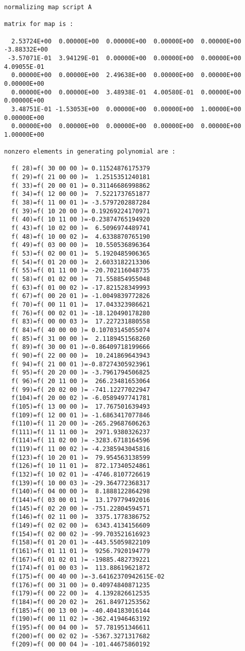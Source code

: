 \begin{footnotesize}
\begin{verbatim}
normalizing map script A

matrix for map is :

  2.53724E+00  0.00000E+00  0.00000E+00  0.00000E+00  0.00000E+00 -3.88332E+00
 -3.57071E-01  3.94129E-01  0.00000E+00  0.00000E+00  0.00000E+00  4.09055E-01
  0.00000E+00  0.00000E+00  2.49638E+00  0.00000E+00  0.00000E+00  0.00000E+00
  0.00000E+00  0.00000E+00  3.48938E-01  4.00580E-01  0.00000E+00  0.00000E+00
  3.48751E-01 -1.53053E+00  0.00000E+00  0.00000E+00  1.00000E+00  0.00000E+00
  0.00000E+00  0.00000E+00  0.00000E+00  0.00000E+00  0.00000E+00  1.00000E+00

nonzero elements in generating polynomial are :

  f( 28)=f( 30 00 00 )= 0.11524876175379
  f( 29)=f( 21 00 00 )=  1.2515351240181
  f( 33)=f( 20 00 01 )= 0.31146686998862
  f( 34)=f( 12 00 00 )=  7.5221737651877
  f( 38)=f( 11 00 01 )= -3.5797202887284
  f( 39)=f( 10 20 00 )= 0.19269224170971
  f( 40)=f( 10 11 00 )=-0.23874765194920
  f( 43)=f( 10 02 00 )=  6.5096974489741
  f( 48)=f( 10 00 02 )=  4.6338870765190
  f( 49)=f( 03 00 00 )=  10.550536896364
  f( 53)=f( 02 00 01 )=  5.1920485906365
  f( 54)=f( 01 20 00 )=  2.6033182213306
  f( 55)=f( 01 11 00 )= -20.702116048735
  f( 58)=f( 01 02 00 )=  71.558854955048
  f( 63)=f( 01 00 02 )= -17.821528349993
  f( 67)=f( 00 20 01 )= -1.0049839772826
  f( 70)=f( 00 11 01 )=  17.043323986621
  f( 76)=f( 00 02 01 )= -18.120490178280
  f( 83)=f( 00 00 03 )=  17.227231880558
  f( 84)=f( 40 00 00 )= 0.10703145055074
  f( 85)=f( 31 00 00 )=  2.1189451568260
  f( 89)=f( 30 00 01 )=-0.86409718199666
  f( 90)=f( 22 00 00 )=  10.241869643943
  f( 94)=f( 21 00 01 )=-0.87274305923961
  f( 95)=f( 20 20 00 )= -3.7961794506825
  f( 96)=f( 20 11 00 )=  266.23481653064
  f( 99)=f( 20 02 00 )= -741.12277022947
  f(104)=f( 20 00 02 )= -6.0589497741781
  f(105)=f( 13 00 00 )=  17.767501639493
  f(109)=f( 12 00 01 )= -1.6863417077846
  f(110)=f( 11 20 00 )= -265.29687606263
  f(111)=f( 11 11 00 )=  2971.9380326237
  f(114)=f( 11 02 00 )= -3283.6718164596
  f(119)=f( 11 00 02 )= -4.2385943045816
  f(123)=f( 10 20 01 )=  79.954563138599
  f(126)=f( 10 11 01 )=  872.17340524861
  f(132)=f( 10 02 01 )= -4746.8107726619
  f(139)=f( 10 00 03 )= -29.364772368317
  f(140)=f( 04 00 00 )=  8.1888122864298
  f(144)=f( 03 00 01 )=  13.179779492016
  f(145)=f( 02 20 00 )= -751.22804594571
  f(146)=f( 02 11 00 )=  3375.1778386752
  f(149)=f( 02 02 00 )=  6343.4134156609
  f(154)=f( 02 00 02 )= -99.703521616923
  f(158)=f( 01 20 01 )= -443.55059822109
  f(161)=f( 01 11 01 )=  9256.7920194779
  f(167)=f( 01 02 01 )= -19885.482739221
  f(174)=f( 01 00 03 )=  113.88619621872
  f(175)=f( 00 40 00 )=-3.64162370942615E-02
  f(176)=f( 00 31 00 )= 0.40974840871235
  f(179)=f( 00 22 00 )=  4.1392826612535
  f(184)=f( 00 20 02 )=  261.84971253562
  f(185)=f( 00 13 00 )= -40.404183016144
  f(190)=f( 00 11 02 )= -362.41946463192
  f(195)=f( 00 04 00 )=  57.781951346611
  f(200)=f( 00 02 02 )= -5367.3271317682
  f(209)=f( 00 00 04 )= -101.44675860192


\end{verbatim}
\end{footnotesize}

